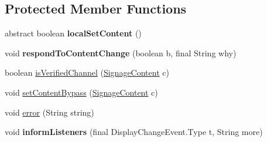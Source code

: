 \subsection*{Protected Member Functions}
\begin{DoxyCompactItemize}
\item 
\hypertarget{classgov_1_1fnal_1_1ppd_1_1dd_1_1display_1_1DisplayImpl_ad7d3f64a1788e1ba7887fc47028fb9c3}{abstract boolean {\bfseries local\-Set\-Content} ()}\label{classgov_1_1fnal_1_1ppd_1_1dd_1_1display_1_1DisplayImpl_ad7d3f64a1788e1ba7887fc47028fb9c3}

\item 
\hypertarget{classgov_1_1fnal_1_1ppd_1_1dd_1_1display_1_1DisplayImpl_af28651f04a72d5fc629c14e3ceb87026}{void {\bfseries respond\-To\-Content\-Change} (boolean b, final String why)}\label{classgov_1_1fnal_1_1ppd_1_1dd_1_1display_1_1DisplayImpl_af28651f04a72d5fc629c14e3ceb87026}

\item 
boolean \hyperlink{classgov_1_1fnal_1_1ppd_1_1dd_1_1display_1_1DisplayImpl_a1cd34d3710136494c4cfad17c29bc001}{is\-Verified\-Channel} (\hyperlink{interfacegov_1_1fnal_1_1ppd_1_1dd_1_1signage_1_1SignageContent}{Signage\-Content} c)
\item 
void \hyperlink{classgov_1_1fnal_1_1ppd_1_1dd_1_1display_1_1DisplayImpl_a4f5d156cebdc544eaa992153e5ccd137}{set\-Content\-Bypass} (\hyperlink{interfacegov_1_1fnal_1_1ppd_1_1dd_1_1signage_1_1SignageContent}{Signage\-Content} c)
\item 
void \hyperlink{classgov_1_1fnal_1_1ppd_1_1dd_1_1display_1_1DisplayImpl_ab240ed8a72e4006fb21eb6f30765f3df}{error} (String string)
\item 
\hypertarget{classgov_1_1fnal_1_1ppd_1_1dd_1_1display_1_1DisplayImpl_a04adde70a67c57c9c785d04913a4d3be}{void {\bfseries inform\-Listeners} (final Display\-Change\-Event.\-Type t, String more)}\label{classgov_1_1fnal_1_1ppd_1_1dd_1_1display_1_1DisplayImpl_a04adde70a67c57c9c785d04913a4d3be}

\end{DoxyCompactItemize}
